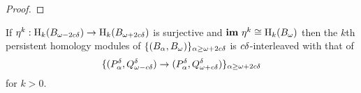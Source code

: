 \begin{proof}
%
\end{proof}

\begin{corollary}
  If $\eta^k : \mathrm{H}_k(B_{\omega - 2c{\delta}})\to \mathrm{H}_k(B_{\omega + 2c{\delta}})$ is surjective and $\mathbf{im}~\eta^k\cong \mathrm{H}_k(B_\omega)$ then the $k$th persistent homology modules of
  $\{(B_\alpha, B_\omega)\}_{\alpha\geq\omega + 2c{\delta}}$ is $c{\delta}$-interleaved with that of
  \[\{(P_\alpha^{\delta}, Q_{\omega - c{\delta}}^{\delta})\to (P_\alpha^{\delta}, Q_{\omega + c{\delta}}^{\delta})\}_{\alpha\geq\omega + 2c{\delta}}\]
  for $k > 0$.
\end{corollary}

